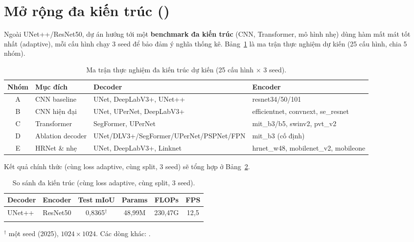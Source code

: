 \section{Mở rộng đa kiến trúc \textnormal{()}}
\label{sec:multi_arch}

Ngoài UNet++/ResNet50, dự án hướng tới một \textbf{benchmark đa kiến trúc} (CNN,
Transformer, mô hình nhẹ) dùng hàm mất mát tốt nhất (adaptive), mỗi cấu hình chạy 3
seed để bảo đảm ý nghĩa thống kê. Bảng~\ref{tab:matrix} là ma trận thực nghiệm dự
kiến (25 cấu hình, chia 5 nhóm).

\begin{table}[H]
\centering
\caption{Ma trận thực nghiệm đa kiến trúc dự kiến (25 cấu hình $\times$ 3 seed).}
\label{tab:matrix}
\small
\begin{tabular}{c l l l}
\toprule
\textbf{Nhóm} & \textbf{Mục đích} & \textbf{Decoder} & \textbf{Encoder} \\
\midrule
A & CNN baseline      & UNet, DeepLabV3+, UNet++ & resnet34/50/101 \\
B & CNN hiện đại      & UNet, UPerNet, DeepLabV3+ & efficientnet, convnext, se\_resnet \\
C & Transformer       & SegFormer, UPerNet & mit\_b3/b5, swinv2, pvt\_v2 \\
D & Ablation decoder  & UNet/DLV3+/SegFormer/UPerNet/PSPNet/FPN & mit\_b3 (cố định) \\
E & HRNet \& nhẹ      & UNet, DeepLabV3+, Linknet & hrnet\_w48, mobilenet\_v2, mobileone \\
\bottomrule
\end{tabular}
\end{table}

Kết quả chính thức (cùng loss adaptive, cùng split, 3 seed) sẽ tổng hợp ở
Bảng~\ref{tab:multiarch}.

\begin{table}[H]
\centering
\caption{So sánh đa kiến trúc (cùng loss adaptive, cùng split, 3 seed).}
\label{tab:multiarch}
\small
\begin{tabular}{l l c c c c}
\toprule
\textbf{Decoder} & \textbf{Encoder} & \textbf{Test mIoU} & \textbf{Params} & \textbf{FLOPs} & \textbf{FPS} \\
\midrule
UNet++ & ResNet50 & 0{,}8365$^\dagger$ & 48{,}99M & 230{,}47G & 12{,}5 \\
\TBD{} & \TBD{} & \TBD{} & \TBD{} & \TBD{} & \TBD{} \\
\bottomrule
\end{tabular}
\end{table}
{\footnotesize $^\dagger$ một seed (2025), $1024\times1024$. Các dòng khác: .}

